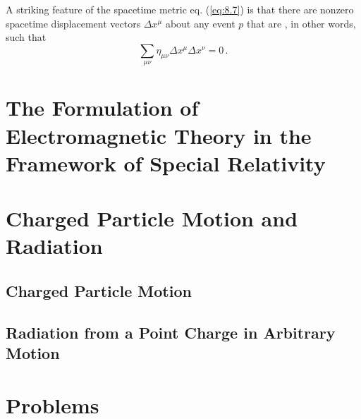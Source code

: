 A striking feature of the spacetime metric eq. (\ref{eq:8.7}) is that there are nonzero spacetime displacement vectors $\Delta x^\mu$
about any event $p$ that are , in other words, such that 
\begin{equation}\label{eq:8.10}
\sum_{\mu \nu} \eta_{\mu \nu} \Delta x^\mu \Delta x^\nu = 0 \,.
\end{equation}

\section{The Formulation of Electromagnetic Theory in the Framework of Special Relativity}\label{sec:8.2}

\section{Charged Particle Motion and Radiation}\label{sec:8.3}

\subsection{Charged Particle Motion}\label{ssec:8.3.1}

\subsection{Radiation from a Point Charge in Arbitrary Motion}\label{ssec:8.3.2}


\section*{Problems}



